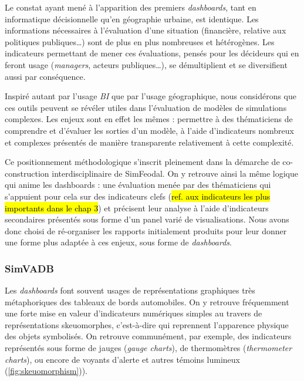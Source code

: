 	Le constat ayant mené à l'apparition des premiers \textit{dashboards}, tant en informatique décisionnelle qu'en géographie urbaine, est identique.
	Les informations nécessaires à l'évaluation d'une situation (financière, relative aux politiques publiques\ldots) sont de plus en plus nombreuses et hétérogènes.
	Les indicateurs permettant de mener ces évaluations, pensés pour les décideurs qui en feront usage (\textit{managers}, acteurs publiques\ldots), se démultiplient et se diversifient aussi par conséquence.

	Inspiré autant par l'usage \textit{BI} que par l'usage géographique, nous considérons que ces outils peuvent se révéler utiles dans l'évaluation de modèles de simulations complexes.
	Les enjeux sont en effet les mêmes : permettre à des thématiciens de comprendre et d'évaluer les sorties d'un modèle, à l'aide d'indicateurs nombreux et complexes présentés de manière transparente relativement à cette complexité.

	Ce positionnement méthodologique s'inscrit pleinement dans la démarche de co-construction interdisciplinaire de SimFeodal.
	On y retrouve ainsi la même logique qui anime les dashboards : une évaluation menée par des thématiciens qui s'appuient pour cela sur des indicateurs clefs (\hl{ref. aux indicateurs les plus importants dans le chap 3}) et précisent leur analyse à l'aide d'indicateurs secondaires présentés sous forme d'un panel varié de visualisations.
	Nous avons donc choisi de ré-organiser les rapports initialement produits pour leur donner une forme plus adaptée à ces enjeux, sous forme de \textit{dashboards}.

	\subsubsection{SimVADB}\label{subsubsec:simvadb}

	Les \textit{dashboards} font souvent usages de représentations graphiques très métaphoriques des tableaux de bords automobiles.
	On y retrouve fréquemment une forte mise en valeur d'indicateurs numériques simples au travers de représentations \og skeuomorphes\fg{}, c'est-à-dire qui reprennent l'apparence physique des objets symbolisés.
	On retrouve communément, par exemple, des indicateurs représentés sous forme de jauges (\textit{gauge charts}), de thermomètres (\textit{thermometer charts}), ou encore de voyants d'alerte et autres témoins lumineux (\cref{fig:skeuomorphism})).
	
